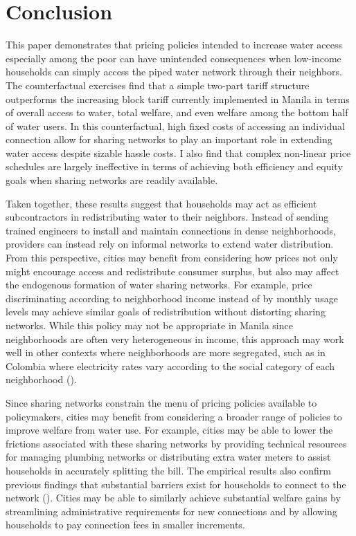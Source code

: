 \documentclass[12pt]{article}
\begin{document}
\section{Conclusion}\label{section:conclusion}


This paper demonstrates that pricing policies intended to increase water access especially among the poor can have unintended consequences when low-income households can simply access the piped water network through their neighbors.  The counterfactual exercises find that a simple two-part tariff structure outperforms the increasing block tariff currently implemented in Manila in terms of overall access to water, total welfare, and even welfare among the bottom half of water users.  In this counterfactual, high fixed costs of accessing an individual connection allow for sharing networks to play an important role in extending water access despite sizable hassle costs.  I also find that complex non-linear price schedules are largely ineffective in terms of achieving both efficiency and equity goals when sharing networks are readily available.  

Taken together, these results suggest that households may act as efficient subcontractors in redistributing water to their neighbors.  Instead of sending trained engineers to install and maintain connections in dense neighborhoods, providers can instead rely on informal networks to extend water distribution.  From this perspective, cities may benefit from considering how prices not only might encourage access and redistribute consumer surplus, but also may affect the endogenous formation of water sharing networks.  For example, price discriminating according to neighborhood income instead of by monthly usage levels may achieve similar goals of redistribution without distorting sharing networks.  While this policy may not be appropriate in Manila since neighborhoods are often very heterogeneous in income, this approach may work well in other contexts where neighborhoods are more segregated, such as in Colombia where electricity rates vary according to the social category of each neighborhood (\cite{mcrae2014infrastructure}).  

Since sharing networks constrain the menu of pricing policies available to policymakers, cities may benefit from considering a broader range of policies to improve welfare from water use.  For example, cities may be able to lower the frictions associated with these sharing networks by providing technical resources for managing plumbing networks or distributing extra water meters to assist households in accurately splitting the bill.  The empirical results also confirm previous findings that substantial barriers exist for households to connect to the network (\cite{devoto2012happiness}).  Cities may be able to similarly achieve substantial welfare gains by streamlining administrative requirements for new connections and by allowing households to pay connection fees in smaller increments.  
\end{document}
